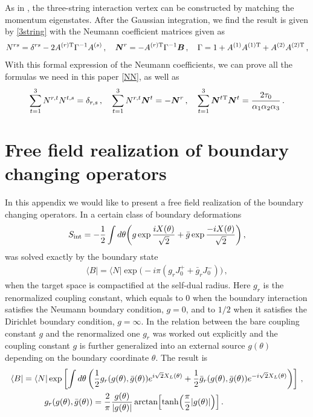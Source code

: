 \documentclass[12pt]{article}
\begin{document}
As in \cite{GS}, the three-string interaction vertex can be
constructed by matching the momentum eigenstates.
After the Gaussian integration, we find the result is given by
\eqref{3string} with the Neumann coefficient matrices given as
\begin{align}
N^{rs}=\delta^{rs}-2A^{(r)\rm T}\Gamma^{-1}A^{(s)}\,,\quad
\boldsymbol{N}^r=-A^{(r)\rm T}\Gamma^{-1}\boldsymbol{B}\,,\quad
\Gamma=1+A^{(1)}A^{(1)\rm T}+A^{(2)}A^{(2)\rm T}\,,
\end{align}
With this formal expression of the Neumann coefficients, we can prove
all the formulas we need in this paper \eqref{NN}, as well as \cite{Y}
\begin{align}
\sum_{t=1}^3N^{r,t}N^{t,s}=\delta_{r,s}\,,\quad
\sum_{t=1}^3N^{r,t}\boldsymbol{N}^t=-\boldsymbol{N}^r\,,\quad
\sum_{t=1}^3\boldsymbol{N}^{t{\rm T}}\boldsymbol{N}^t
={2\tau_0\over \alpha_1\alpha_2\alpha_3}\,.
\end{align}

\section{Free field realization of boundary changing operators}
In this appendix we would like to present a free field realization of
the boundary changing operators.
In \cite{CKLM} a certain class of boundary deformations
\begin{align}
S_{\rm int}=-\frac{1}{2}\int d\theta
\biggl(g\exp\frac{iX(\theta)}{\sqrt{2}}+
\bar g\exp\frac{-iX(\theta)}{\sqrt{2}}\biggr)\,,
\end{align}
was solved exactly by the boundary state
\begin{align}
\langle B|=\langle N|\exp\bigl(-i\pi(g_rJ^+_0+\bar g_rJ^-_0)\bigr)\,,
\end{align}
when the target space is compactified at the self-dual radius.
Here $g_r$ is the renormalized coupling constant, which equals to $0$
when the boundary interaction satisfies the Neumann boundary
condition, $g=0$, and to $1/2$ when it satisfies the Dirichlet
boundary condition, $g=\infty$.
In \cite{KT} the relation between the bare coupling constant $g$ and
the renormalized one $g_r$ was worked out explicitly and the coupling
constant $g$ is further generalized into an external source
$g(\theta)$ depending on the boundary coordinate $\theta$.
The result is
\begin{align}
&\langle B|=\langle N|\exp\left[\int
d\theta\left(\frac{1}{2}g_r(g(\theta),\bar g(\theta))
e^{i\sqrt{2}X_L(\theta)}
+\frac{1}{2}\bar g_r(g(\theta),\bar g(\theta))
e^{-i\sqrt{2}X_L(\theta)}
\right)\right]\,,\\
&\qquad\qquad g_r(g(\theta),\bar g(\theta))
=\frac{2}{\pi}\frac{g(\theta)}{|g(\theta)|}
\arctan\Bigl[\tanh\Bigl(\frac{\pi}{2}|g(\theta)|\Bigr)\Bigr]\,.
\end{align}
\end{document}

